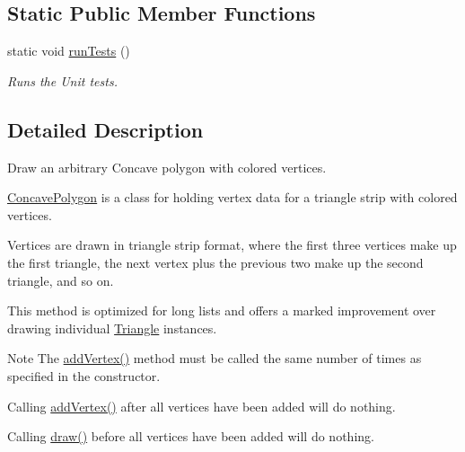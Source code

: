 \subsection*{\-Static \-Public \-Member \-Functions}
\begin{DoxyCompactItemize}
\item 
static void \hyperlink{classtsgl_1_1_concave_polygon_ace68fa148735bf43d9648cb58a04ac46}{run\-Tests} ()
\begin{DoxyCompactList}\small\item\em \-Runs the \-Unit tests. \end{DoxyCompactList}\end{DoxyCompactItemize}


\subsection{\-Detailed \-Description}
\-Draw an arbitrary \-Concave polygon with colored vertices. 

\hyperlink{classtsgl_1_1_concave_polygon}{\-Concave\-Polygon} is a class for holding vertex data for a triangle strip with colored vertices.

\-Vertices are drawn in triangle strip format, where the first three vertices make up the first triangle, the next vertex plus the previous two make up the second triangle, and so on.

\-This method is optimized for long lists and offers a marked improvement over drawing individual \hyperlink{classtsgl_1_1_triangle}{\-Triangle} instances. \begin{DoxyNote}{\-Note}
\-The \hyperlink{classtsgl_1_1_concave_polygon_ae2675ff0bf54cc7092a9ab3418dcab30}{add\-Vertex()} method must be called the same number of times as specified in the constructor. 

\-Calling \hyperlink{classtsgl_1_1_concave_polygon_ae2675ff0bf54cc7092a9ab3418dcab30}{add\-Vertex()} after all vertices have been added will do nothing. 

\-Calling \hyperlink{classtsgl_1_1_concave_polygon_a06d759932483ae2b54bb807db20cbc4a}{draw()} before all vertices have been added will do nothing. 
\end{DoxyNote}


